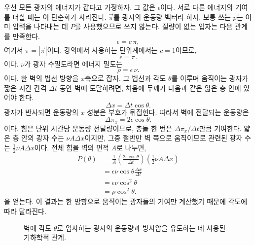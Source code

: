 우선 모든 광자의 에너지가 같다고 가정하자. 그 값은 \(\epsilon\)이다. 서로 다른 에너지의 기여를 더할 때는 이 단순화가 사라진다. \(\vec{\pi}\)를 광자의 운동량 벡터라 하자. 보통 쓰는 \(p\)는 이미 압력을 나타내는 데 \(P\)를 사용했으므로 쓰지 않는다. 질량이 없는 입자는 다음 관계를 만족한다.
\begin{equation}
\epsilon=c\,\pi,
\end{equation}
여기서 \(\pi=|\vec{\pi}|\)이다. 강의에서 사용하는 단위계에서는 \(c=1\)이므로,
\begin{equation}
\epsilon=\pi.
\end{equation}
이다. \(\nu\)가 광자 수밀도라면 에너지 밀도는
\begin{equation}
\rho=\epsilon\,\nu.
\end{equation}
이다. 한 벽의 법선 방향을 \(x\)축으로 잡자. 그 법선과 각도 \(\theta\)를 이루며 움직이는 광자가 짧은 시간 간격 \(\Delta t\) 동안 벽에 도달하려면, 처음에 두께가 다음과 같은 얇은 층 안에 있어야 한다.
\begin{equation}
\Delta x=\Delta t\cos\theta.
\end{equation}
광자가 반사되면 운동량의 \(x\) 성분은 부호가 뒤집힌다. 따라서 벽에 전달되는 운동량은
\begin{equation}
\Delta \pi_x=2\epsilon\cos\theta.
\end{equation}
이다. 힘은 단위 시간당 운동량 전달량이므로, 충돌 한 번은 \(\Delta \pi_x/\Delta t\)만큼 기여한다. 얇은 층 안의 광자 수는 \(\nu A\Delta x\)이지만, 그중 절반만 벽 쪽으로 움직이므로 관련된 광자 수는 \(\tfrac12 \nu A\Delta x\)이다. 전체 힘을 벽의 면적 \(A\)로 나누면,
\begin{align}
P(\theta)
&=
\frac{1}{A}
\left(\frac{2\epsilon\cos\theta}{\Delta t}\right)
\left(\frac12 \nu A\Delta x\right) \\
&=
\epsilon\nu\cos\theta\frac{\Delta x}{\Delta t} \\
&=
\epsilon\nu\cos^2\theta \\
&=
\rho\cos^2\theta.
\end{align}
을 얻는다. 이 결과는 한 방향으로 움직이는 광자들의 기여만 계산했기 때문에 각도에 따라 달라진다.

\begin{figure}[htbp]
\centering
{}
\caption{벽에 각도 \(\theta\)로 입사하는 광자의 운동량과 방사압을 유도하는 데 사용된 기하학적 관계.}
\label{fig:c05-photon-pressure}
\end{figure}

